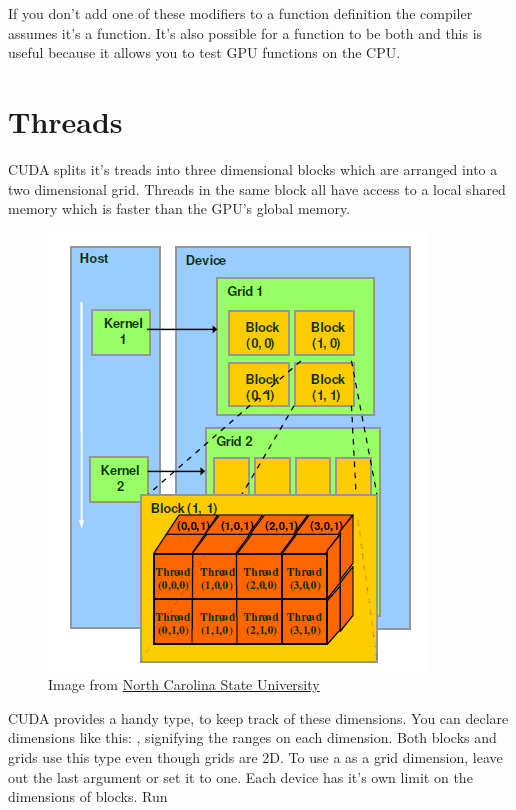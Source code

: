 \documentclass[letterpaper,10pt,openany,oneside]{sphinxmanual}
\begin{document}
If you don't add one of these modifiers to a function definition the compiler assumes it's a  function. It's also possible for a function to be both  and  this is useful because it allows you to test GPU functions on the CPU.


\section{Threads}
\label{0-Introduction/Introduction:threads}
CUDA splits it's treads into three dimensional blocks which are arranged into a two dimensional grid.
Threads in the same block all have access to a local shared memory which is
faster than the GPU's global memory.
\begin{figure}[htbp]
\centering
\capstart

\includegraphics{cudathreads.png}
\caption{Image from \href{http://wiki.expertiza.ncsu.edu/images/7/7a/Cuda\_Fig2.png}{North Carolina State University}}\end{figure}

CUDA provides a handy type,  to keep track of these dimensions. You can
declare dimensions like this: , signifying the ranges on each
dimension.  Both blocks and grids
use this type even though grids are 2D.
To use a  as a grid dimension, leave out the last argument or set it to one.
Each device has it's own limit on the dimensions of blocks.
Run
\end{document}

